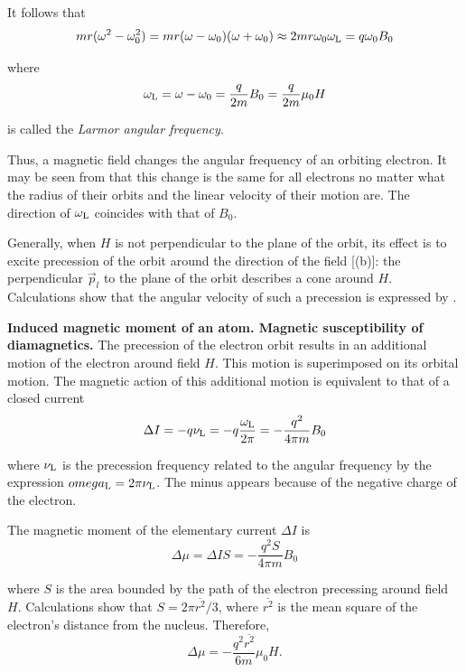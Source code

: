 \noindent
It follows that
\begin{equation}\label{eq:7_36}
    mr (\omega^2 - \omega_0^2) = mr (\omega - \omega_0) (\omega + \omega_0) \approx 2 m r \omega_0 \omega_{\text{L}} = q \omega_0 B_0
\end{equation}

\noindent
where
\begin{equation}\label{eq:7_37}
    \omega_{\text{L}} = \omega - \omega_0 = \frac{q}{2m} B_0 = \frac{q}{2m} \mu_0 H
\end{equation}

\noindent
is called the \textit{Larmor angular frequency}.

Thus, a magnetic field changes the angular frequency of an orbiting electron. It may be seen from  that this change is the same for all electrons no matter what the radius of their orbits and the linear velocity of their motion are. The direction of $\omega_{\text{L}}$ coincides with that of $B_0$.

Generally, when $H$ is not perpendicular to the plane of the orbit, its effect is to excite precession of the orbit around the direction of
the field [(b)]: the perpendicular $\vec{p}_l$ to the plane of the orbit describes a cone around $H$. Calculations show that the angular
velocity of such a precession is expressed by .

\textbf{Induced magnetic moment of an atom. Magnetic susceptibility of diamagnetics.} The precession of the electron orbit results in an additional motion of the electron around field $H$. This motion is superimposed on its orbital motion. The magnetic action of this additional motion is equivalent to that of a closed current
\begin{equation}\label{eq:7_38}
    \Delta{I} = - q \nu_{\text{L}} = - q \frac{\omega_{\text{L}}}{2\pi} = - \frac{q^2}{4\pi m} B_0
\end{equation}

\noindent
where $\nu_{\text{L}}$ is the precession frequency related to the angular frequency by the expression $\\omega_{\text{L}}=2\pi\nu_{\text{L}}$. The minus appears because of the negative charge of the electron.

The magnetic moment of the elementary current $\Delta{I}$ is
\begin{equation}\label{eq:7_39}
    \Delta{\mu} = \Delta{I} S = - \frac{q^2 S}{4\pi m} B_0
\end{equation}

\noindent
where $S$ is the area bounded by the path of the electron precessing around field $H$. Calculations show that $S=2\pi \overline{r^2}/3$, where $\overline{r^2}$ is the mean square of the electron's distance from the nucleus. Therefore,
\begin{equation}\label{eq:7_40}
    \Delta{\mu} = - \frac{q^2 \overline{r^2}}{6 m} \mu_0 H.
\end{equation}

